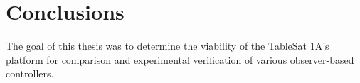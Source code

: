\chapter{Conclusions}
\label{chap:Conclusions}

The goal of this thesis was to determine the viability of the TableSat 1A's platform for comparison and experimental verification of various observer-based controllers.
